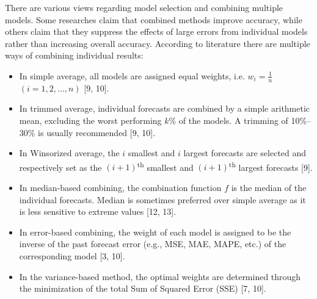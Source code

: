 There are various views regarding model selection and combining multiple models. Some researches claim that combined methods improve accuracy, while others claim that they suppress the effects of large errors from individual models rather than increasing overall accuracy. According to literature there are multiple ways of combining individual results:
\begin{itemize}
\item In simple average, all models are assigned equal weights, i.e. $w_{i}=\frac{1}{n}$ $(i=1, 2,..., n)$ [9, 10].
\item In trimmed average, individual forecasts are combined by a simple arithmetic mean, excluding the worst performing $k$\% of the models. A trimming of 10\%–30\% is usually recommended [9, 10].
\item In Winsorized average, the $i$ smallest and $i$ largest forecasts are selected and respectively set as the $(i+1)$\textsuperscript{th} smallest and $(i+1)$\textsuperscript{th} largest forecasts [9].
\item In median-based combining, the combination function $f$ is the median of the individual forecasts. Median is sometimes preferred over simple average as it is less sensitive to extreme values [12, 13].
\item In error-based combining, the weight of each model is assigned to be the inverse of the past forecast error (e.g., MSE, MAE, MAPE, etc.) of the corresponding model [3, 10].
\item In the variance-based method, the optimal weights are determined through the minimization of the total Sum of Squared Error (SSE) [7, 10].
\end{itemize}